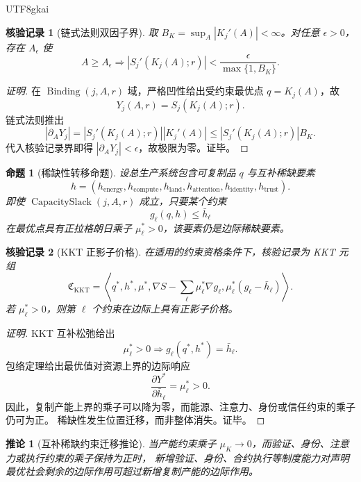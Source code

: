 \documentclass[12pt,a4paper,openany]{report}
\newtheorem{proposition}{命题}[chapter]
\newtheorem{corollary}{推论}[chapter]
\newtheorem{Certificate}{核验记录}[chapter]
\newcommand{\Abs}[1]{\left\lvert #1\right\rvert}
\newcommand{\Tuple}[1]{\left\langle #1\right\rangle}
\DeclareMathOperator{\CapacitySlack}{CapacitySlack}
\DeclareMathOperator{\Binding}{Binding}
\begin{document}
\begin{CJK*}{UTF8}{gkai}
\begin{Certificate}[链式法则双因子界]
取 \(B_K=\sup_A\Abs{K_j'(A)}<\infty\)。对任意 \(\epsilon>0\)，存在 \(A_\epsilon\) 使
\[
  A\ge A_\epsilon
  \Longrightarrow
  \Abs{S_j'(K_j(A);r)}<\frac{\epsilon}{\max\{1,B_K\}}.
\]
\end{Certificate}

\begin{proof}[证明]
在 \(\Binding(j,A,r)\) 域，严格凹性给出受约束最优点 \(q=K_j(A)\)，故
\[
  Y_j(A,r)=S_j(K_j(A);r).
\]
链式法则推出
\[
  \Abs{\partial_A Y_j}
  =\Abs{S_j'(K_j(A);r)}\Abs{K_j'(A)}
  \le\Abs{S_j'(K_j(A);r)}B_K.
\]
代入核验记录界即得 \(\Abs{\partial_A Y_j}<\epsilon\)，故极限为零。证毕。
\end{proof}

\begin{proposition}[稀缺性转移命题]
\label{prop:scarcity-transfer}
设总生产系统包含可复制品 \(q\) 与互补稀缺要素
\[
  h=(h_{\mathrm{energy}},h_{\mathrm{compute}},h_{\mathrm{land}},
  h_{\mathrm{attention}},h_{\mathrm{identity}},h_{\mathrm{trust}}).
\]
即使 \(\CapacitySlack(j,A,r)\) 成立，只要某个约束
\[
  g_\ell(q,h)\le\bar h_\ell
\]
在最优点具有正拉格朗日乘子 \(\mu_\ell^*>0\)，该要素仍是边际稀缺要素。
\end{proposition}

\begin{Certificate}[KKT 正影子价格]
在适用的约束资格条件下，核验记录为 KKT 元组
\[
  \mathfrak C_{\mathrm{KKT}}
  =\Tuple{q^*,h^*,\mu^*,
  \nabla S-\sum_\ell\mu_\ell^*\nabla g_\ell,
  \mu_\ell^*(g_\ell-\bar h_\ell)}.
\]
若 \(\mu_\ell^*>0\)，则第 \(\ell\) 个约束在边际上具有正影子价格。
\end{Certificate}

\begin{proof}[证明]
KKT 互补松弛给出
\[
  \mu_\ell^*>0
  \Longrightarrow
  g_\ell(q^*,h^*)=\bar h_\ell.
\]
包络定理给出最优值对资源上界的边际响应
\[
  \frac{\partial Y^*}{\partial\bar h_\ell}=\mu_\ell^*>0.
\]
因此，复制产能上界的乘子可以降为零，而能源、注意力、身份或信任约束的乘子仍可为正。
稀缺性发生位置迁移，而非整体消失。证毕。
\end{proof}

\begin{corollary}[互补稀缺约束迁移推论]
\label{cor:constraint-governance-transfer}
当产能约束乘子 \(\mu_K\to0\)，而验证、身份、注意力或执行约束的乘子保持为正时，
新增验证、身份、合约执行等制度能力对声明最优社会剩余的边际作用可超过新增复制产能的边际作用。
\end{corollary}


\end{CJK*}
\end{document}
